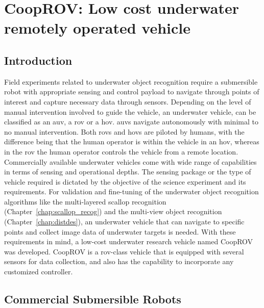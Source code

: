 
\chapter{CoopROV: Low cost underwater remotely operated vehicle}
\label{chap:cooprov}


\section{Introduction}

Field experiments related to underwater object recognition require a submersible robot with appropriate sensing and control payload to navigate through points of interest and capture necessary data through sensors. Depending on the level of manual intervention involved to guide the vehicle, an underwater vehicle, can be classified as an \gls{auv}, a \gls{rov} or a \gls{hov}. \gls{auv}s navigate autonomously with minimal to no manual intervention. Both \gls{rov}s and \gls{hov}s are piloted by humans, with the difference being that the human operator is within the vehicle in an \gls{hov}, whereas in the \gls{rov} the human operator controls the vehicle from a remote location. Commercially available underwater vehicles come with wide range of capabilities in terms of sensing and operational depths. The sensing package or the type of vehicle required is dictated by the objective of the science experiment and its requirements. For validation and fine-tuning of the underwater object recognition algorithms like the 
multi-layered scallop recognition (Chapter~\ref{chap:scallop_recog}) and the multi-view object recognition (Chapter~\ref{chap:distdes}), an underwater vehicle that can navigate to specific points and collect image data of underwater targets is needed. With these requirements in mind, a low-cost underwater research vehicle named CoopROV was developed. CoopROV is a \gls{rov}-class vehicle that is equipped with several sensors for data collection, and also has the capability to incorporate any customized controller.

\section{Commercial Submersible Robots}

